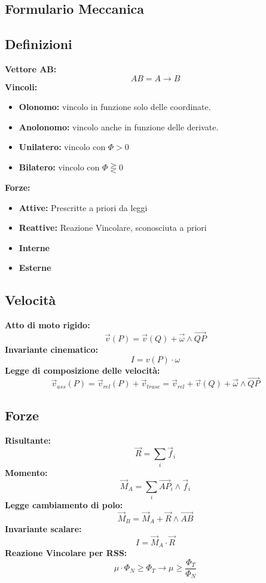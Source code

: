 \documentclass[a4paper]{report}
\begin{document}
\begin{center}
\section*{Formulario Meccanica}
\end{center}

\subsection*{Definizioni}
\textbf{Vettore AB:}
\[
AB = A\longrightarrow B
\]
\textbf{Vincoli:}
\begin{itemize}
    \item \textbf{Olonomo:} vincolo in funzione solo delle coordinate.
    \item \textbf{Anolonomo:} vincolo anche in funzione delle derivate.
    \item \textbf{Unilatero:} vincolo con $\Phi > 0$
    \item \textbf{Bilatero:} vincolo con $\Phi\gtreqless 0 $
\end{itemize}
\textbf{Forze:}
\begin{itemize}
    \item \textbf{Attive:} Prescritte a priori da leggi
    \item \textbf{Reattive:} Reazione Vincolare, sconosciuta a priori
    \item \textbf{Interne}
    \item \textbf{Esterne}
\end{itemize}
\subsection*{Velocità}
\textbf{Atto di moto rigido:} 
\[
\vec{v}(P)=\vec{v}(Q)+\vec{\omega}\wedge \vec{QP}
\]
\textbf{Invariante cinematico: } 
\[
I=v(P)\cdot\omega    
\]
\textbf{Legge di composizione delle velocità: }
\[
\vec{v}_{ass}(P)=\vec{v}_{rel}(P) + \vec{v}_{trasc} = \vec{v}_{rel} +\vec{v}(Q) + \vec{\omega}\wedge \vec{QP}   
\]

\subsection*{Forze}
\textbf{Risultante: }
\[
\vec{R} = \sum_i \vec{f}_i    
\]
\textbf{Momento: }
\[
    \vec{M}_A=\sum_i \vec{AP}_i\wedge\vec{f}_i    
\]
\textbf{Legge cambiamento di polo: }
\[
\vec{M}_B=\vec{M}_A+\vec{R}\wedge \vec{AB}    
\]
\textbf{Invariante scalare: }
\[
I=\vec{M}_A\cdot \vec{R}
\]
\textbf{Reazione Vincolare per RSS: }
\[
    \mu\cdot\Phi_N \geq \Phi_T \longrightarrow \mu \geq \frac{\Phi_T}{\Phi_N}
\]
\end{document}

